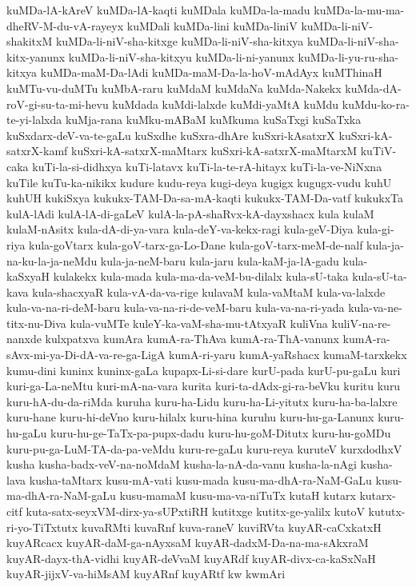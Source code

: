 {kuMDa-lA-kAreV
kuMDa-lA-kaqti
kuMDala
kuMDa-la-madu
kuMDa-la-mu-ma-dheRV-M-du-vA-rayeyx
kuMDali
kuMDa-lini
kuMDa-liniV
kuMDa-li-niV-shakitxM
kuMDa-li-niV-sha-kitxge
kuMDa-li-niV-sha-kitxya
kuMDa-li-niV-sha-kitx-yanunx
kuMDa-li-niV-sha-kitxyu
kuMDa-li-ni-yanunx
kuMDa-li-yu-ru-sha-kitxya
kuMDa-maM-Da-lAdi
kuMDa-maM-Da-la-hoV-mAdAyx
kuMThinaH
kuMTu-vu-duMTu
kuMbA-raru
kuMdaM
kuMdaNa
kuMda-Nakekx
kuMda-dA-roV-gi-su-ta-mi-hevu
kuMdada
kuMdi-lalxde
kuMdi-yaMtA
kuMdu
kuMdu-ko-ra-te-yi-lalxda
kuMja-rana
kuMku-mABaM
kuMkuma
kuSaTxgi
kuSaTxka
kuSxdarx-deV-va-te-gaLu
kuSxdhe
kuSxra-dhAre
kuSxri-kAsatxrX
kuSxri-kA-satxrX-kamf
kuSxri-kA-satxrX-maMtarx
kuSxri-kA-satxrX-maMtarxM
kuTiV-caka
kuTi-la-si-didhxya
kuTi-latavx
kuTi-la-te-rA-hitayx
kuTi-la-ve-NiNxna
kuTile
kuTu-ka-nikikx
kudure
kudu-reya
kugi-deya
kugigx
kugugx-vudu
kuhU
kuhUH
kukiSxya
kukukx-TAM-Da-sa-mA-kaqti
kukukx-TAM-Da-vatf
kukukxTa
kulA-lAdi
kulA-lA-di-gaLeV
kulA-la-pA-shaRvx-kA-dayxshacx
kula
kulaM
kulaM-nAsitx
kula-dA-di-ya-vara
kula-deY-va-kekx-ragi
kula-geV-Diya
kula-gi-riya
kula-goVtarx
kula-goV-tarx-ga-Lo-Dane
kula-goV-tarx-meM-de-nalf
kula-ja-na-ku-la-ja-neMdu
kula-ja-neM-baru
kula-jaru
kula-kaM-ja-lA-gadu
kula-kaSxyaH
kulakekx
kula-mada
kula-ma-da-veM-bu-dilalx
kula-sU-taka
kula-sU-ta-kava
kula-shacxyaR
kula-vA-da-va-rige
kulavaM
kula-vaMtaM
kula-va-lalxde
kula-va-na-ri-deM-baru
kula-va-na-ri-de-veM-baru
kula-va-na-ri-yada
kula-va-ne-titx-nu-Diva
kula-vuMTe
kuleY-ka-vaM-sha-mu-tAtxyaR
kuliVna
kuliV-na-re-nanxde
kulxpatxva
kumAra
kumA-ra-ThAva
kumA-ra-ThA-vanunx
kumA-ra-sAvx-mi-ya-Di-dA-va-re-ga-LigA
kumA-ri-yaru
kumA-yaRshacx
kumaM-tarxkekx
kumu-dini
kuninx
kuninx-gaLa
kupapx-Li-si-dare
kurU-pada
kurU-pu-gaLu
kuri
kuri-ga-La-neMtu
kuri-mA-na-vara
kurita
kuri-ta-dAdx-gi-ra-beVku
kuritu
kuru
kuru-hA-du-da-riMda
kuruha
kuru-ha-Lidu
kuru-ha-Li-yitutx
kuru-ha-ba-lalxre
kuru-hane
kuru-hi-deVno
kuru-hilalx
kuru-hina
kuruhu
kuru-hu-ga-Lanunx
kuru-hu-gaLu
kuru-hu-ge-TaTx-pa-pupx-dadu
kuru-hu-goM-Ditutx
kuru-hu-goMDu
kuru-pu-ga-LuM-TA-da-pa-veMdu
kuru-re-gaLu
kuru-reya
kuruteV
kurxdodhxV
kusha
kusha-badx-veV-na-noMdaM
kusha-la-nA-da-vanu
kusha-la-nAgi
kusha-lava
kusha-taMtarx
kusu-mA-vati
kusu-mada
kusu-ma-dhA-ra-NaM-GaLu
kusu-ma-dhA-ra-NaM-gaLu
kusu-mamaM
kusu-ma-va-niTuTx
kutaH
kutarx
kutarx-citf
kuta-satx-seyxVM-dirx-ya-sUPxtiRH
kutitxge
kutitx-ge-yalilx
kutoV
kututx-ri-yo-TiTxtutx
kuvaRMti
kuvaRnf
kuva-raneV
kuviRVta
kuyAR-caCxkatxH
kuyARcacx
kuyAR-daM-ga-nAyxsaM
kuyAR-dadxM-Da-na-ma-sAkxraM
kuyAR-dayx-thA-vidhi
kuyAR-deVvaM
kuyARdf
kuyAR-divx-ca-kaSxNaH
kuyAR-jijxV-va-hiMsAM
kuyARnf
kuyARtf
kw
kwmAri
}
